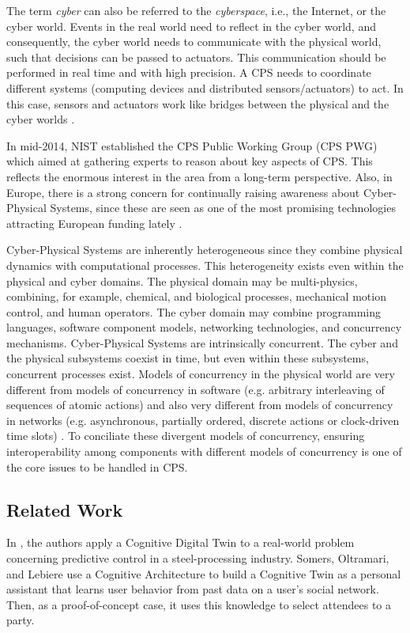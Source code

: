 The term \emph{cyber} can also be referred to the \emph{cyberspace}, i.e., the Internet, or the cyber world. Events in the real world need to reflect in the cyber world, and consequently, the cyber world needs to communicate with the physical world, such that decisions can be passed to actuators. This communication should be performed in real time and with high precision. A CPS needs to coordinate different systems (computing devices and distributed sensors/actuators) to act. In this case, sensors and actuators work like bridges between the physical and the cyber worlds \citep{khaitan2015design}.

In mid-2014, NIST established the CPS Public Working Group (CPS PWG) which aimed at gathering experts to reason about key aspects of CPS. This reflects the enormous interest in the area from a long-term perspective. Also, in Europe, there is a strong concern for continually raising awareness about Cyber-Physical Systems, since these are seen as one of the most promising technologies attracting European funding lately \citep{haakansson2015reasoning}.


Cyber-Physical Systems are inherently heterogeneous since they combine physical dynamics with computational processes. This heterogeneity exists even within the physical and cyber domains. The physical domain may be multi-physics, combining, for example,  chemical, and biological processes, mechanical motion control, and human operators. The cyber domain may combine programming languages, software component models, networking technologies, and concurrency mechanisms.
Cyber-Physical Systems are intrinsically concurrent. The cyber and the physical subsystems coexist in time, but even within these subsystems, concurrent processes exist. Models of concurrency in the physical world are very different from models of concurrency in software (e.g. arbitrary interleaving of sequences of atomic actions) and also very different from models of concurrency in networks (e.g. asynchronous, partially ordered, discrete actions or clock-driven time slots) \citep{lee2006cyber}. To conciliate these divergent models of concurrency, ensuring interoperability among components with different models of concurrency is one of the core issues to be handled in CPS.


\subsection{Related Work}
\label{relatedwork}


In \cite{abburu2020cognitive}, the authors apply a Cognitive Digital Twin to a real-world problem concerning predictive control in a steel-processing industry. Somers, Oltramari, and Lebiere \citep{somerscognitive, somers2020cognitive} use a Cognitive Architecture to build a Cognitive Twin as a personal assistant that learns user behavior from past data on a user's social network. Then, as a proof-of-concept case, it uses this knowledge to select attendees to a party. 

